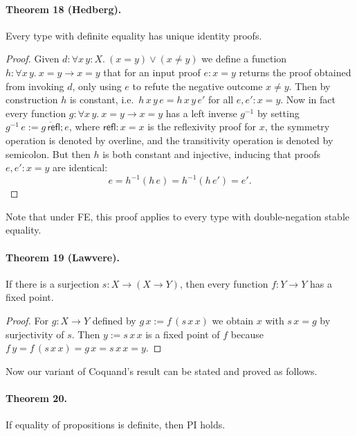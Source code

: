 \documentclass[10pt,a4paper]{amsart}
\begin{document}
\paragraph{Theorem 18 (Hedberg).} Every type with definite equality has unique identity proofs.
\begin{proof}
Given $d:\forall x\,y:X.\ (x=y)\lor(x\ne y)$ we define a function $h:\forall x\,y.\ x=y\to x=y$ that for an input proof $e:x=y$ returns the proof obtained from invoking $d$, only using $e$ to refute the negative outcome $x\ne y$.
Then by construction $h$ is constant, i.e.\ $h\,x\,y\,e=h\,x\,y\,e'$ for all $e,e':x=y$.
Now in fact every function $g:\forall x\,y.\ x=y\to x=y$ has a left inverse $g^{-1}$ by setting $g^{-1}\,e:=\overline{g\,\mathsf{refl}};e$, where $\mathsf{refl}:x=x$ is the reflexivity proof for $x$, the symmetry operation is denoted by overline, and the transitivity operation is denoted by semicolon.
But then $h$ is both constant and injective, inducing that proofs $e,e':x=y$ are identical:
\[
e=h^{-1}(h\,e)=h^{-1}(h\,e')=e'.
\]
\end{proof}
Note that under FE, this proof applies to every type with double-negation stable equality.
\paragraph{Theorem 19 (Lawvere).} If there is a surjection $s:X\to(X\to Y)$, then every function $f:Y\to Y$ has a fixed point.
\begin{proof}
For $g:X\to Y$ defined by $g\,x:=f\,(s\,x\,x)$ we obtain $x$ with $s\,x=g$ by surjectivity of $s$.
Then $y:=s\,x\,x$ is a fixed point of $f$ because $f\,y=f\,(s\,x\,x)=g\,x=s\,x\,x=y$.
\end{proof}
Now our variant of Coquand's result can be stated and proved as follows.

\paragraph{Theorem 20.} If equality of propositions is definite, then PI holds.
\end{document}
